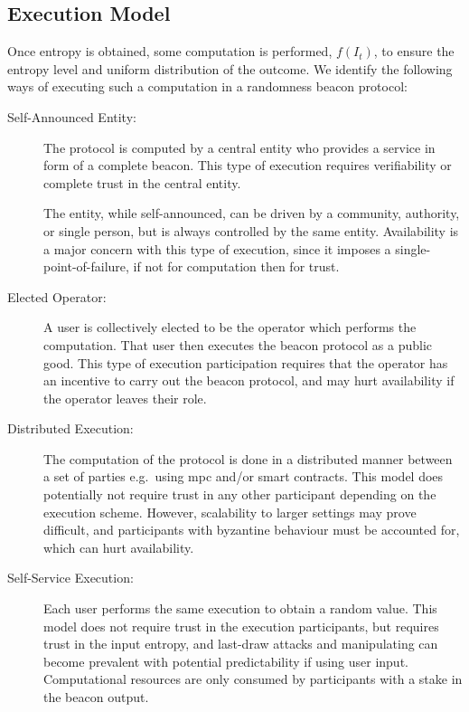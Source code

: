 \subsection{Execution Model}
Once entropy is obtained, some computation is performed, $f(I_t)$, to ensure the entropy level and uniform distribution of the outcome.
We identify the following ways of executing such a computation in a randomness beacon protocol:

\begin{description}
    \item[Self-Announced Entity:]
        The protocol is computed by a central entity who provides a service in form of a complete beacon.
        This type of execution requires verifiability or complete trust in the central entity.

        The entity, while self-announced, can be driven by a community, authority, or single person, but is always controlled by the same entity.
        Availability is a major concern with this type of execution, since it imposes a single-point-of-failure, if not for computation then for trust.

    \item[Elected Operator:]
        A user is collectively elected to be the operator which performs the computation.
        That user then executes the beacon protocol as a public good.
        This type of execution participation requires that the operator has an incentive to carry out the beacon protocol, and may hurt availability if the operator leaves their role.

    \item[Distributed Execution:]
        The computation of the protocol is done in a distributed manner between a set of parties e.g.\ using \gls{mpc} and/or smart contracts.
        This model does potentially not require trust in any other participant depending on the execution scheme.
        However, scalability to larger settings may prove difficult, and participants with byzantine behaviour must be accounted for, which can hurt availability.

    \item[Self-Service Execution:]
        Each user performs the same execution to obtain a random value.
        This model does not require trust in the execution participants, but requires trust in the input entropy, and last-draw attacks and manipulating can become prevalent with potential predictability if using user input.
        Computational resources are only consumed by participants with a stake in the beacon output.
\end{description}

